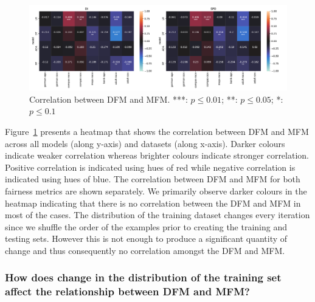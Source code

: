 \documentclass{article}
\begin{document}
\begin{figure}
  \centering
  \includegraphics[width=0.95\linewidth]{heatmap--corr--full-data.pdf}
  \caption{Correlation between DFM and MFM. ***: $p\le0.01$; **:
  $p\le0.05$; *: $p\le0.1$}
  \label{fig:heatmap--corr--full-data}
\end{figure}

Figure \ref{fig:heatmap--corr--full-data} presents a heatmap that
shows the correlation between DFM and MFM across all models (along
y-axis) and datasets (along x-axis). Darker colours indicate weaker
correlation whereas brighter colours indicate stronger
correlation. Positive correlation is indicated using hues of red while
negative correlation is indicated using hues of blue. The correlation
between DFM and MFM for both fairness metrics are shown separately. We
primarily observe darker colours in the heatmap indicating that there
is no correlation between the DFM and MFM in most of the cases. The
distribution of the training dataset changes every iteration since we
shuffle the order of the examples prior to creating the training and
testing sets. However this is not enough to produce a significant
quantity of change and thus consequently no correlation amongst the
DFM and MFM.

\subsubsection{How does change in the distribution of the training set
  affect the relationship between DFM and MFM?}\label{sec:results-full-rel-dist}
\end{document}
